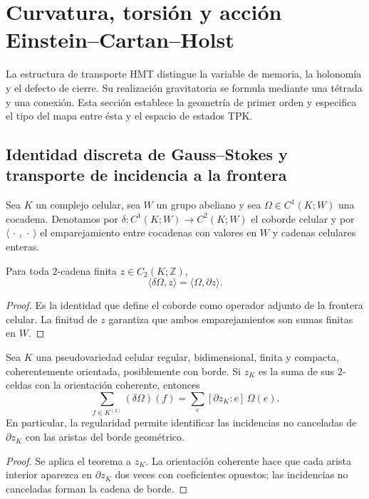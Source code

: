 \section{Curvatura, torsión y acción Einstein--Cartan--Holst}
\label{chap:gravedad-cartan-holst}

La estructura de transporte HMT distingue la variable de memoria, la
holonomía y el defecto de cierre. Su realización gravitatoria se formula
mediante una tétrada y una conexión. Esta sección establece la geometría de
primer orden y especifica el tipo del mapa entre ésta y el espacio de estados
TPK\@.

\subsection{Identidad discreta de Gauss–Stokes y transporte de incidencia a la frontera}

Sea \(K\) un complejo celular, sea \(W\) un grupo abeliano y sea
\(\Omega\in C^1(K;W)\) una cocadena. Denotamos por
\(\delta:C^1(K;W)\to C^2(K;W)\) el coborde celular y por
\(\langle\,\cdot\,,\,\cdot\,\rangle\) el emparejamiento entre cocadenas con
valores en \(W\) y cadenas celulares enteras.

\begin{theorem}
Para toda \(2\)-cadena finita \(z\in C_2(K;\mathbb Z)\),
\[
 \boxed{\langle\delta\Omega,z\rangle
 =\langle\Omega,\partial z\rangle.}
\]
\end{theorem}
\begin{proof}
Es la identidad que define el coborde como operador adjunto de la frontera
celular. La finitud de \(z\) garantiza que ambos emparejamientos son sumas
finitas en \(W\).
\end{proof}

\begin{corollary}
Sea \(K\) una pseudovariedad celular regular, bidimensional, finita y compacta,
coherentemente orientada, posiblemente con borde. Si \(z_K\) es la suma de
sus \(2\)-celdas con la orientación coherente, entonces
\[
 \sum_{f\in K^{(2)}}(\delta\Omega)(f)
 =\sum_e[\partial z_K:e]\,\Omega(e).
\]
En particular, la regularidad permite identificar las incidencias no
canceladas de \(\partial z_K\) con las aristas del borde geométrico.
\end{corollary}
\begin{proof}
Se aplica el teorema a \(z_K\). La orientación coherente hace que cada arista
interior aparezca en \(\partial z_K\) dos veces con coeficientes opuestos;
las incidencias no canceladas forman la cadena de borde.
\end{proof}

